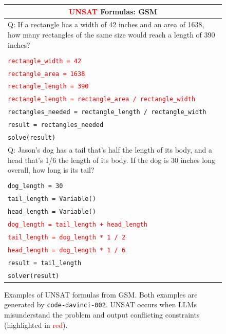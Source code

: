 \documentclass{article}
\theoremstyle{definition}
\newcommand\ttsmall[1]{\texttt{\small #1}}
\newcommand{\gsm}{\textsc{GSM}}
\begin{document}
\begin{figure}[h]
    \footnotesize
    \centering
    \begin{tabularx}{\linewidth}{X}
    \toprule
        \multicolumn{1}{c}{\bf \textcolor{red}{UNSAT} Formulas: \gsm{}} \\
         \midrule
    Q: If a rectangle has a width of 42 inches and an area of 1638, how many rectangles of the same size would reach a length of 390 inches? \\
    \\
  \tt  \textcolor{red}{rectangle\_width = 42}\\
  \tt \textcolor{red}{rectangle\_area = 1638} \\
  \tt  \textcolor{red}{rectangle\_length = 390} \\
  \tt  \textcolor{red}{rectangle\_length = rectangle\_area / rectangle\_width} \\
   \tt rectangles\_needed = rectangle\_length / rectangle\_width \\
  \tt  result = rectangles\_needed \\
   \tt solve(result) \\
    \midrule
Q: Jason's dog has a tail that's half the length of its body, and a head that's 1/6 the length of its body. If the dog is 30 inches long overall, how long is its tail? \\
\\
  \tt  dog\_length = 30 \\
 \tt   tail\_length = Variable() \\
  \tt  head\_length = Variable() \\
  \tt  \textcolor{red}{dog\_length = tail\_length + head\_length} \\
  \tt  \textcolor{red}{tail\_length = dog\_length * 1 / 2} \\
   \tt \textcolor{red}{head\_length = dog\_length * 1 / 6} \\
   \tt result = tail\_length\\
   \tt solver(result) \\
    \bottomrule
    \end{tabularx}
    \caption{ Examples of UNSAT formulas from \gsm{}. Both examples are generated by \ttsmall{code-davinci-002}. UNSAT occurs when LLMs misunderstand the problem and output conflicting constraints (highlighted in \textcolor{red}{red}).}
    \label{fig:usat_exs_gsm}
\end{figure}
\end{document}

